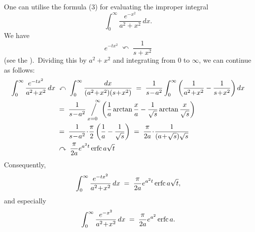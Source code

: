 \documentclass[12pt]{article}
\newcommand{\sijoitus}[2]%
{\operatornamewithlimits{\Big/}_{\!\!\!#1}^{\,#2}}
\begin{document}
One can utilise the formula (3) for evaluating the improper integral
$$\int_0^\infty\frac{e^{-x^2}}{a^2\!+\!x^2}\,dx.$$
We have
$$e^{-tx^2} \;\curvearrowleft\; \frac{1}{s\!+\!x^2}$$
(see the ).\, Dividing this by $a^2\!+\!x^2$ and integrating from 0 to $\infty$, we can continue as follows:
\begin{align*}
\int_0^\infty\frac{e^{-tx^2}}{a^2\!+\!x^2}\,dx & \;\curvearrowleft\; \int_0^\infty\frac{dx}{(a^2\!+\!x^2)(s\!+\!x^2)}
\;=\; \frac{1}{s\!-\!a^2}\int_0^\infty\left(\frac{1}{a^2\!+\!x^2}-\frac{1}{s\!+\!x^2}\right)dx\\
& \;=\; \frac{1}{s\!-\!a^2}\sijoitus{x=0}{\quad\infty}\left(\frac{1}{a}\arctan\frac{x}{a}-\frac{1}{\sqrt{s}}\arctan\frac{x}{\sqrt{s}}\right)\\
& \;=\; \frac{1}{s\!-\!a^2}\!\cdot\!\frac{\pi}{2}\left(\frac{1}{a}-\frac{1}{\sqrt{s}}\right)
 \;=\; \frac{\pi}{2a}\!\cdot\!\frac{1}{(a\!+\!\sqrt{s})\sqrt{s}}\\
& \;\curvearrowright\; \frac{\pi}{2a}e^{a^2t}\,{\rm erfc}\,a\sqrt{t}
\end{align*}
Consequently, 
$$\int_0^\infty\frac{e^{-tx^2}}{a^2\!+\!x^2}\,dx \;=\; \frac{\pi}{2a}e^{a^2t}\,{\rm erfc}\,a\sqrt{t},$$
and especially
$$\int_0^\infty\frac{e^{-x^2}}{a^2\!+\!x^2}\,dx \;=\; \frac{\pi}{2a}e^{a^2}\,{\rm erfc}\,a.$$

\end{document}
